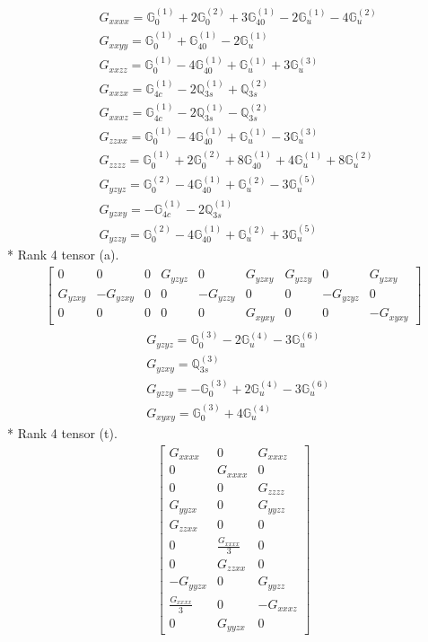 \documentclass[fleqn,8pt,landscape]{jsarticle}
\begin{document}
\begin{align*}
& G_{xxxx} = \mathbb{G}_{0}^{(1)} + 2 \mathbb{G}_{0}^{(2)} + 3 \mathbb{G}_{40}^{(1)} - 2 \mathbb{G}_{u}^{(1)} - 4 \mathbb{G}_{u}^{(2)} \\
& G_{xxyy} = \mathbb{G}_{0}^{(1)} + \mathbb{G}_{40}^{(1)} - 2 \mathbb{G}_{u}^{(1)} \\
& G_{xxzz} = \mathbb{G}_{0}^{(1)} - 4 \mathbb{G}_{40}^{(1)} + \mathbb{G}_{u}^{(1)} + 3 \mathbb{G}_{u}^{(3)} \\
& G_{xxzx} = \mathbb{G}_{4c}^{(1)} - 2 \mathbb{Q}_{3s}^{(1)} + \mathbb{Q}_{3s}^{(2)} \\
& G_{xxxz} = \mathbb{G}_{4c}^{(1)} - 2 \mathbb{Q}_{3s}^{(1)} - \mathbb{Q}_{3s}^{(2)} \\
& G_{zzxx} = \mathbb{G}_{0}^{(1)} - 4 \mathbb{G}_{40}^{(1)} + \mathbb{G}_{u}^{(1)} - 3 \mathbb{G}_{u}^{(3)} \\
& G_{zzzz} = \mathbb{G}_{0}^{(1)} + 2 \mathbb{G}_{0}^{(2)} + 8 \mathbb{G}_{40}^{(1)} + 4 \mathbb{G}_{u}^{(1)} + 8 \mathbb{G}_{u}^{(2)} \\
& G_{yzyz} = \mathbb{G}_{0}^{(2)} - 4 \mathbb{G}_{40}^{(1)} + \mathbb{G}_{u}^{(2)} - 3 \mathbb{G}_{u}^{(5)} \\
& G_{yzxy} = - \mathbb{G}_{4c}^{(1)} - 2 \mathbb{Q}_{3s}^{(1)} \\
& G_{yzzy} = \mathbb{G}_{0}^{(2)} - 4 \mathbb{G}_{40}^{(1)} + \mathbb{G}_{u}^{(2)} + 3 \mathbb{G}_{u}^{(5)}
\end{align*}
* Rank 4 tensor (a).
\begin{align*}
\begin{bmatrix} 0 & 0 & 0 & G_{yzyz} & 0 & G_{yzxy} & G_{yzzy} & 0 & G_{yzxy} \\ G_{yzxy} & - G_{yzxy} & 0 & 0 & - G_{yzzy} & 0 & 0 & - G_{yzyz} & 0 \\ 0 & 0 & 0 & 0 & 0 & G_{xyxy} & 0 & 0 & - G_{xyxy} \end{bmatrix}
\end{align*}
\begin{align*}
& G_{yzyz} = \mathbb{G}_{0}^{(3)} - 2 \mathbb{G}_{u}^{(4)} - 3 \mathbb{G}_{u}^{(6)} \\
& G_{yzxy} = \mathbb{Q}_{3s}^{(3)} \\
& G_{yzzy} = - \mathbb{G}_{0}^{(3)} + 2 \mathbb{G}_{u}^{(4)} - 3 \mathbb{G}_{u}^{(6)} \\
& G_{xyxy} = \mathbb{G}_{0}^{(3)} + 4 \mathbb{G}_{u}^{(4)}
\end{align*}
* Rank 4 tensor (t).
\begin{align*}
\begin{bmatrix} G_{xxxx} & 0 & G_{xxxz} \\ 0 & G_{xxxx} & 0 \\ 0 & 0 & G_{zzzz} \\ G_{yyzx} & 0 & G_{yyzz} \\ G_{zzxx} & 0 & 0 \\ 0 & \frac{G_{xxxx}}{3} & 0 \\ 0 & G_{zzxx} & 0 \\ - G_{yyzx} & 0 & G_{yyzz} \\ \frac{G_{xxxx}}{3} & 0 & - G_{xxxz} \\ 0 & G_{yyzx} & 0 \end{bmatrix}
\end{align*}
\end{document}
